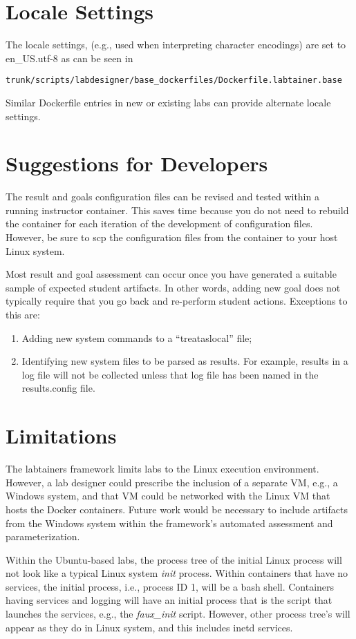 \documentclass[12pt]{article}
\begin{document}
\section{Locale Settings}
The locale settings, (e.g., used when interpreting character encodings) are set to en\_US.utf-8 
as can be seen in 
\begin{verbatim}
trunk/scripts/labdesigner/base_dockerfiles/Dockerfile.labtainer.base
\end{verbatim}
Similar Dockerfile entries in new or existing labs can provide alternate locale settings.

\section{Suggestions for Developers}
The result and goals configuration files can be revised and tested within a
running instructor container.  This saves time because you do not need to rebuild
the container for each iteration of the development of configuration files.  However,
be sure to scp the configuration files from the container to your host Linux system.

Most result and goal assessment can occur once you have generated a suitable sample of
expected student artifacts.  In other words, adding new goal does not typically require
that you go back and re-perform student actions.  Exceptions to this are:

\begin{enumerate}
\item Adding new system commands to a ``treataslocal'' file;
\item Identifying new system files to be parsed as results.  For example, results in a log
file will not be collected unless that log file has been named in the results.config file.
\end{enumerate}

\section{Limitations}
The labtainers framework limits labs to the Linux execution environment.
However, a lab designer could prescribe the inclusion of a separate
VM, e.g., a Windows system, and that VM could be networked with the Linux
VM that hosts the Docker containers.  Future work would be necessary to include
artifacts from the Windows system within the framework's automated assessment
and parameterization.

Within the Ubuntu-based labs, the process tree of the initial Linux process will
not look like a typical Linux system \textit{init} process.  Within containers that have no
services, the initial process, i.e., process ID 1, will be a bash shell.
Containers having services and logging will have an initial process that is
the script that launches the services, e.g., the \textit{faux\_init} script.  However,
other process tree's will appear as they
do in Linux system, and this includes inetd services.
\end{document}
